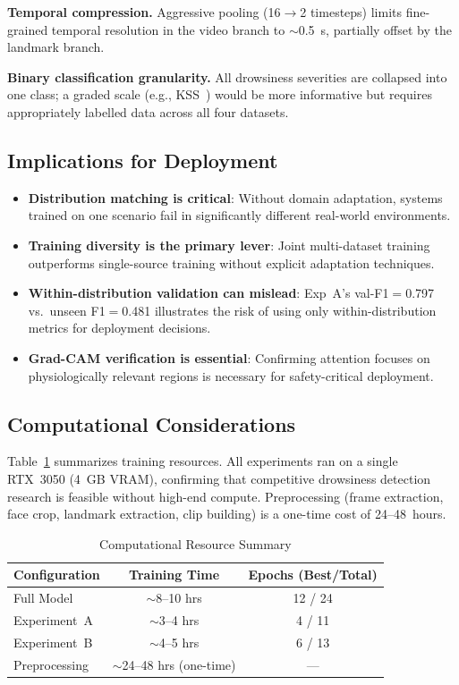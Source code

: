 \documentclass[journal]{IEEEtran}
\begin{document}
\textbf{Temporal compression.} Aggressive pooling (16$\rightarrow$2 timesteps) limits fine-grained temporal resolution in the video branch to $\sim$0.5~s, partially offset by the landmark branch.

\textbf{Binary classification granularity.} All drowsiness severities are collapsed into one class; a graded scale (e.g., KSS~\cite{kaida2006}) would be more informative but requires appropriately labelled data across all four datasets.

\subsection{Implications for Deployment}
\label{sec:implications}

\begin{itemize}[leftmargin=*]
  \item \textbf{Distribution matching is critical}: Without domain adaptation, systems trained on one scenario fail in significantly different real-world environments.
  \item \textbf{Training diversity is the primary lever}: Joint multi-dataset training outperforms single-source training without explicit adaptation techniques.
  \item \textbf{Within-distribution validation can mislead}: Exp~A's val-F1$=$0.797 vs.\ unseen F1$=$0.481 illustrates the risk of using only within-distribution metrics for deployment decisions.
  \item \textbf{Grad-CAM verification is essential}: Confirming attention focuses on physiologically relevant regions is necessary for safety-critical deployment.
\end{itemize}

\subsection{Computational Considerations}
\label{sec:compute}
Table~\ref{tab:compute} summarizes training resources. All experiments ran on a single RTX~3050 (4~GB VRAM), confirming that competitive drowsiness detection research is feasible without high-end compute. Preprocessing (frame extraction, face crop, landmark extraction, clip building) is a one-time cost of 24--48~hours.

\begin{table}[t]
  \caption{Computational Resource Summary}
  \label{tab:compute}
  \centering
  \small
  \begin{tabular}{lcc}
    \toprule
    Configuration & Training Time & Epochs (Best/Total) \\
    \midrule
    Full Model    & $\sim$8--10 hrs & 12 / 24 \\
    Experiment~A  & $\sim$3--4 hrs  & 4 / 11 \\
    Experiment~B  & $\sim$4--5 hrs  & 6 / 13 \\
    \midrule
    Preprocessing & $\sim$24--48 hrs (one-time) & --- \\
    \bottomrule
  \end{tabular}
\end{table}
\end{document}

